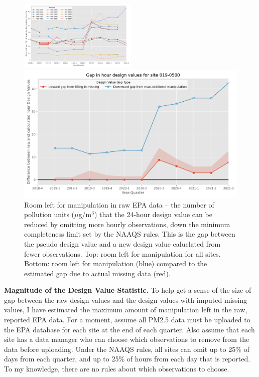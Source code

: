 \documentclass[12pt]{article}
\begin{document}
\begin{figure}
    \centering
    \includegraphics[width=0.5\textwidth]{output/figures/final_results/room_for_manipulation_hour_DV_all_sites.png}
    \smallskip\par
    \includegraphics[width=\linewidth]{output/figures/final_results/room_for_manipulation_hour_DV_site_019-0500_conservative.png}
    \caption{Room left for manipulation in raw EPA data -- the number of pollution units ($\mu$g/m$^3$) that the 24-hour design value can be reduced by omitting more hourly observations, down the minimum completeness limit set by the NAAQS rules. This is the gap between the pseudo design value and a new design value caluclated from fewer observations. Top: room left for manipulation for all sites. Bottom: room left for manipulation (blue) compared to the estimated gap due to actual missing data (red).}
    \label{fig:dv_room_for_manipulation}
\end{figure}

\textbf{Magnitude of the Design Value Statistic.} To help get a sense of the size of gap between the raw design values and the design values with imputed missing values, I have estimated the maximum amount of manipulation left in the raw, reported EPA data. For a moment, assume all PM2.5 data must be uploaded to the EPA database for each site at the end of each quarter. Also assume that each site has a data manager who can choose which observations to remove from the data before uploading. Under the NAAQS rules, all sites can omit up to 25\% of days from each quarter, and up to 25\% of hours from each day that is reported. To my knowledge, there are no rules about which observations to choose.
\end{document}
